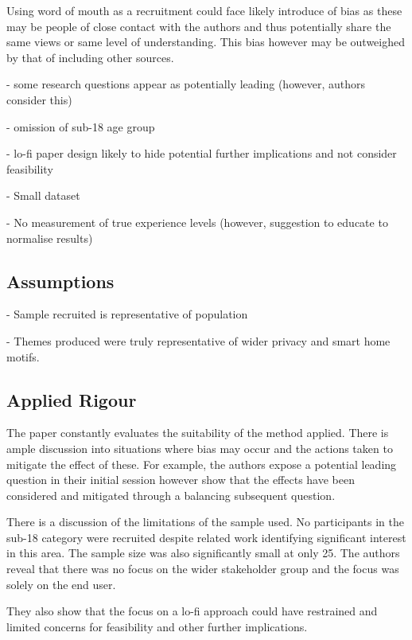 Using word of mouth as a recruitment could face likely introduce of bias as these may be people of close contact with the authors and thus potentially share the same views or same level of understanding. This bias however may be outweighed by that of including other sources.

- some research questions appear as potentially leading (however, authors consider this)

- omission of sub-18 age group

- lo-fi paper design likely to hide potential further implications and not consider feasibility 

- Small dataset

- No measurement of true experience levels (however, suggestion to educate to normalise results)


\subsection{Assumptions}

- Sample recruited is representative of population 

- Themes produced were truly representative of wider privacy and smart home motifs.

\subsection{Applied Rigour}

The paper constantly evaluates the suitability of the method applied. There is ample discussion into situations where bias may occur and the actions taken to mitigate the effect of these. For example, the authors expose a potential leading question in their initial session however show that the effects have been considered and mitigated through a balancing subsequent question. 

There is a discussion of the limitations of the sample used. No participants in the sub-18 category were recruited despite related work identifying significant interest in this area. The sample size was also significantly small at only 25. The authors reveal that there was no focus on the wider stakeholder group and the focus was solely on the end user. 

They also show that the focus on a lo-fi approach could have restrained and limited concerns for feasibility and other further implications.
